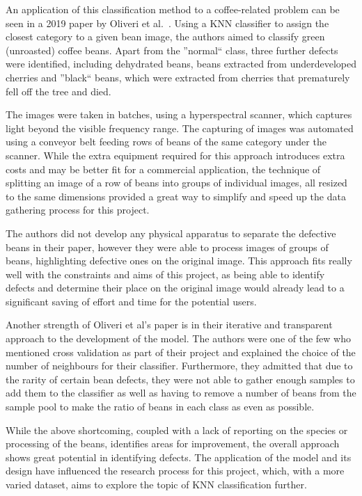 An application of this classification method to a coffee-related problem can be seen in a 2019 paper by Oliveri et al.~\cite{hyperspectralGreenOliveri}.
Using a KNN classifier to assign the closest category to a given bean image, the authors
aimed to classify green (unroasted) coffee beans.
Apart from the ''normal`` class, three further defects were identified, including dehydrated beans, beans extracted from
underdeveloped cherries and ''black`` beans, which were extracted from cherries that prematurely fell off the tree and died.

The images were taken in batches, using a hyperspectral scanner, which captures light
beyond the visible frequency range.
The capturing
of images was automated using a conveyor belt feeding rows of beans of the same category
under the scanner.
While the extra equipment required for this approach
introduces extra costs and may be better fit for a commercial application, the technique
of splitting an image of a row of beans into groups of individual images, all
resized to the same dimensions provided a great way to simplify and speed up the
data gathering process for this project.

The authors did not develop any physical apparatus to separate the defective beans
in their paper, however they were able to process images of groups of beans, highlighting
defective ones on the original image.
This approach fits really well with the
constraints and aims of this project, as being able to identify defects and determine
their place on the original image would already lead to a significant saving of effort
and time for the potential users.

Another strength of Oliveri et al's paper is in their iterative and transparent approach
to the development of the model.
The authors were one of the few who mentioned
cross validation as part of their project and explained the choice of the number
of neighbours for their classifier.
Furthermore, they admitted that due to the
rarity of certain bean defects, they were not able to gather enough samples to add
them to the classifier as well as having to remove a number of beans from the sample
pool to make the ratio of beans in each class as even as possible.

While the above shortcoming, coupled with a lack of reporting on the species or
processing of the beans, identifies areas for improvement, the overall approach
shows great potential in identifying defects.
The application of the model and its
design have influenced the research process for this project, which, with a more
varied dataset, aims to explore the topic of KNN classification further.

